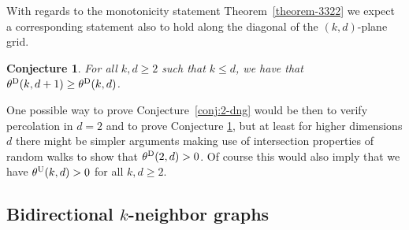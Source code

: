 \documentclass[a4paper, oneside, 11pt]{amsart}
\newtheorem{conj}[theorem]{Conjecture}
\theoremstyle{definition}
\newcommand{\1}{\mathbbm{1}}
\newcommand{\0}{\mathbf{o}}
\numberwithin{equation}{section}
\begin{document}
With regards to the monotonicity statement Theorem~\ref{theorem-3322} we expect a corresponding statement also to hold along the diagonal of the $(k,d)$-plane grid.
\begin{conj}\label{conj:dimensioncouple}
    For all $k,d\ge 2$ such that $k\leq d$, we have that $\theta^{\rm D}(k,d+1)\geq \theta^{\rm D}(k,d)$. 
\end{conj}

One possible way to prove Conjecture~\ref{conj:2-dng} would be then to verify percolation in $d=2$ and to prove Conjecture \ref{conj:dimensioncouple}, but at least for higher dimensions $d$ there might be simpler arguments making use of intersection properties of random walks to show that $\theta^{\rm D}(2,d) > 0$. Of course this would also imply that we have $\theta^{\rm U}(k,d)>0$ for all $k,d\geq2$.  

\subsection{Bidirectional $k$-neighbor graphs}
\end{document}
